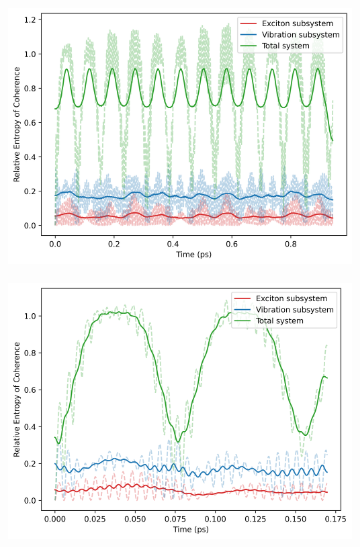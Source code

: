 \documentclass[12pt]{article}
\begin{document}
\begin{figure}[H]
    \centering
    \begin{subfigure}{0.49\textwidth}
        \centering
        \includegraphics[width=\linewidth]{Research Project/Code/results/ExVib/Closed/Envelope/coh.png}
        \caption{}
        \label{fig:EVM_CQS_Coh_env}
    \end{subfigure}
    \hfill
    \begin{subfigure}{0.49\textwidth}
        \centering
        \includegraphics[width=\linewidth]{Research Project/Code/results/ExVib/Closed/Fast/coh.png}
        \caption{}
        \label{fig:EVM_CQS_Coh_fast}
    \end{subfigure}
    
    \caption{}
    \label{fig:EVM_CQS_Coh}
\end{figure}
\end{document}
